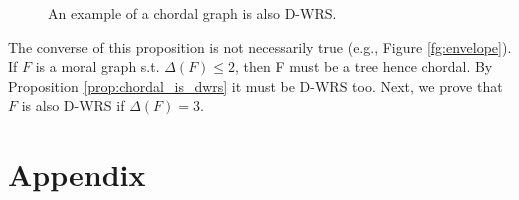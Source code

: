 \begin{figure}[H]
\caption{An example of a chordal graph is also D-WRS.}
\label{fg:chordal_is_dwrs}
\end{figure}

The converse of this proposition is not necessarily true (e.g., Figure \ref{fg:envelope}). If $F$ is a moral graph s.t. $\Delta(F) \le 2$, then F must be a tree hence chordal. By Proposition \ref{prop:chordal_is_dwrs} it must be D-WRS too. Next, we prove that $F$ is also D-WRS if $\Delta(F)=3$.
\fi

\section{Appendix}
